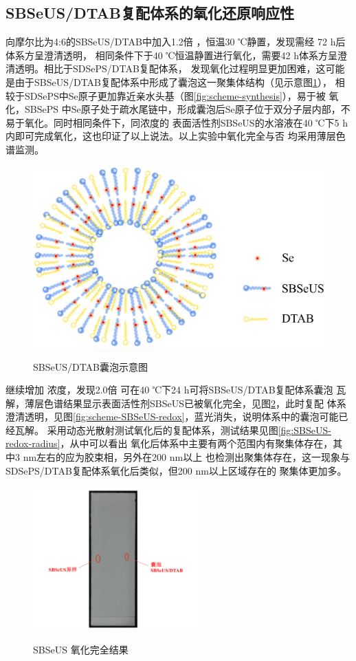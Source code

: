 \documentclass[bachelor,winfonts,replaceperiod]{jnuthesis}
\begin{document}
    \subsection{SBSeUS/DTAB复配体系的氧化还原响应性}
    向摩尔比为4:6的SBSeUS/DTAB中加入1.2倍 ，恒温30 ℃静置，发现需经 72 h后体系方呈澄清透明，
    相同条件下于40 ℃恒温静置进行氧化，需要42 h体系方呈澄清透明。相比于SDSePS/DTAB复配体系，
    发现氧化过程明显更加困难，这可能是由于SBSeUS/DTAB复配体系中形成了囊泡这一聚集体结构（见示意图\ref{fig:scheme-vesicle}），
    相较于SDSePS中Se原子更加靠近亲水头基（图\ref{fig:scheme-synthesis}），易于被 氧化，SBSePS
    中Se原子处于疏水尾链中，形成囊泡后Se原子位于双分子层内部，不易于氧化。同时相同条件下，同浓度的
    表面活性剂SBSeUS的水溶液在40 ℃下5 h内即可完成氧化，这也印证了以上说法。以上实验中氧化完全与否
    均采用薄层色谱监测。
    \begin{figure}[htbp]
        \centering
        \includegraphics[width=0.4\linewidth]{figure/vesicle-scheme.pdf}\\
        \caption{SBSeUS/DTAB囊泡示意图}\label{fig:scheme-vesicle}
    \end{figure}
    
    继续增加  浓度，发现2.0倍  可在40 ℃下24 h可将SBSeUS/DTAB复配体系囊泡
    瓦解，薄层色谱结果显示表面活性剂SBSeUS已被氧化完全，见图\ref{fig:SBSeUS-Ox-tlc}，此时复配
    体系澄清透明，见图\ref{fig:scheme-SBSeUS-redox}，蓝光消失，说明体系中的囊泡可能已经瓦解。
    采用动态光散射测试氧化后的复配体系，测试结果见图\ref{fig:SBSeUS-redox-radius}，从中可以看出
    氧化后体系中主要有两个范围内有聚集体存在，其中3 nm左右的应为胶束相，另外在200 nm以上
    也检测出聚集体存在，这一现象与SDSePS/DTAB复配体系氧化后类似，但200 nm以上区域存在的
    聚集体更加多。
    \begin{figure}[htbp]
        \centering
        \includegraphics[height=5.5cm]{figure/SBSeUS-Ox-tlc}\\
        \caption{SBSeUS 氧化完全结果}\label{fig:SBSeUS-Ox-tlc}
    \end{figure}
    
\end{document}
